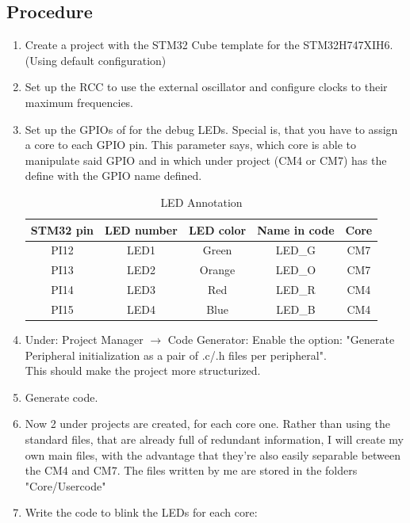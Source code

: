 \subsection{Procedure}
\begin{enumerate}
	\item Create a project with the STM32 Cube template for the STM32H747XIH6. (Using default configuration)
	\item Set up the RCC to use the external oscillator and configure clocks to their maximum frequencies.
	\item Set up the GPIOs of for the debug LEDs. Special is, that you have to assign a core to each GPIO pin. This parameter says, which core is able to manipulate said GPIO and in which under project (CM4 or CM7) has the define with the GPIO name defined. 
		\begin{table}[H]
			\centering
			\label{tab:LED Annotation}
		\begin{tabular}{|| c | c | c | c | c ||} 
		\hline
		STM32 pin & LED number & LED color & Name in code & Core \\ [0.5ex] 
		\hline\hline
		PI12 & LED1 & Green & LED\_G & CM7 \\
		\hline
		PI13 & LED2 & Orange & LED\_O & CM7 \\
		\hline
		PI14 & LED3 & Red & LED\_R & CM4 \\
		\hline
		PI15 & LED4 & Blue & LED\_B & CM4 \\
		\hline
		\end{tabular}
			\caption{LED Annotation}
		\end{table}
	\item Under: Project Manager \(\rightarrow\) Code Generator: Enable the option: "Generate Peripheral initialization as a pair of .c/.h files per peripheral".
	\\ This should make the project more structurized.
	\item Generate code.
	\item Now 2 under projects are created, for each core one. Rather than using the standard files, that are already full of redundant information, I will create my own main files, with the advantage that they're also easily separable between the CM4 and CM7. The files written by me are stored in the folders "Core/Usercode"
	\item Write the code to blink the LEDs for each core:
		

\end{enumerate}
